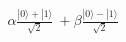 \documentclass[preview]{standalone}
\begin{document}
\begin{align*}
\alpha \frac{|0\rangle + |1\rangle}{\sqrt{2}}\
                     + \beta\frac{|0\rangle - |1\rangle}{\sqrt{2}}
\end{align*}
\end{document}
